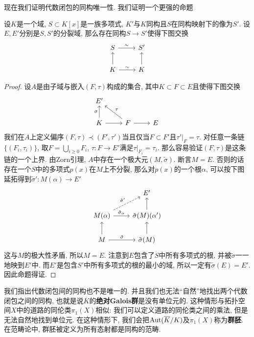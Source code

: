 现在我们证明代数闭包的同构唯一性.
我们证明一个更强的命题
\begin{thm}[同构延拓定理]
    设$K$是一个域, $S\subset K[x]$是一族多项式, $K'$与$K$同构且$S$在同构映射下的像为$S'$.
    设$E,E'$分别是$S,S'$的分裂域, 那么存在同构$S\to S'$使得下图交换
    \[\begin{tikzcd}
        S\ar[r, "\sim"] & S'\\
        K\ar[u] \ar[r, "\sim"] & K\ar[u]
    \end{tikzcd}\]
\end{thm}
\begin{proof}
    设$A$是由子域与嵌入$(F,\tau)$构成的集合, 其中$K\subset F\subset E$且使得下图交换
    \[\begin{tikzcd}
        E' & & \\
        K\ar[u, "\sigma"] \ar[r] & F \ar[ul, "\tau"'] \ar[r] & E
    \end{tikzcd}\]
    我们在$A$上定义偏序$(F,\tau)\prec(F',\tau')$当且仅当$F\subset F'$且$\tau'|_F=\tau$.
    对任意一条链$\{(F_i,\tau_i)\}$, 取$F=\bigcup_{i\geq 0}F_i$, $\tau:F\to E'$满足$\tau|_{F_i}=\tau_i$.
    那么容易验证$(F,\tau)$是这条链的一个上界.
    由Zorn引理, $A$中存在一个极大元$(M,\tilde{\sigma})$.
    断言$M=E$. 否则的话存在一个$S$中的多项式$p(x)$在$M$上不分裂, 那么对$p(x)$的一个根$\alpha$, 可以按下图延拓得到$\tilde{\sigma}':M(\alpha)\to E'$
    \[\begin{tikzcd}
         & E'\\
        M(\alpha)\ar[r, "\tilde{\sigma}_\alpha"] \ar[ur, dashed, "\tilde{\sigma}'"] & \tilde{\sigma}(M)(\alpha') \ar[u]\\
        M \ar[r, "\tilde{\sigma}"] \ar[u] & \tilde{\sigma}(M) \ar[u]
    \end{tikzcd}\]
    这与$M$的极大性矛盾, 所以$M=E$.
    注意到$E$包含了$S$中所有多项式的根, 并被$\tilde{\sigma}$一一地映到$E'$中.
    而$E'$是包含$S'$中所有多项式的根的最小的域, 所以一定有$\tilde{\sigma}(E)=E'$.
    因此命题得证.
\end{proof}

\begin{rem}
    我们指出代数闭包间的同构也不是唯一的.
    并且我们也无法``自然''地找出两个代数闭包之间的同构, 也就是说$\overline{K}$的\textbf{绝对Galois群}是没有单位元的.
    这种情形与拓扑空间$X$中的道路的同伦类$\pi_1(X)$相似: 我们可以定义道路的同伦类之间的乘法, 但是无法自然地找到单位元.
    在这种情形下, 我们会把$\operatorname{Aut}(\overline{K}/K)$及$\pi_1(X)$称为\textbf{群胚}.
    在范畴论中, 群胚被定义为所有态射都是同构的范畴.
\end{rem}